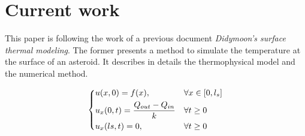 \section{Current work}
\label{currentwork}

This paper is following the work of a previous document \textit{Didymoon's surface thermal modeling}. The former presents a method to simulate the temperature at the surface of an asteroid. It describes in details the thermophysical model and the numerical method.



\begin{equation}
    \begin{dcases}
        u(x,0)=f(x),                        & \forall x\in[0,l_s] \\
        u_x(0,t)=\frac{Q_{out}-Q_{in}}{k}   & \forall t\geq0      \\
        u_x(ls,t)=0,                        & \forall t\geq0
    \end{dcases}
    \label{eq 23}
\end{equation}
